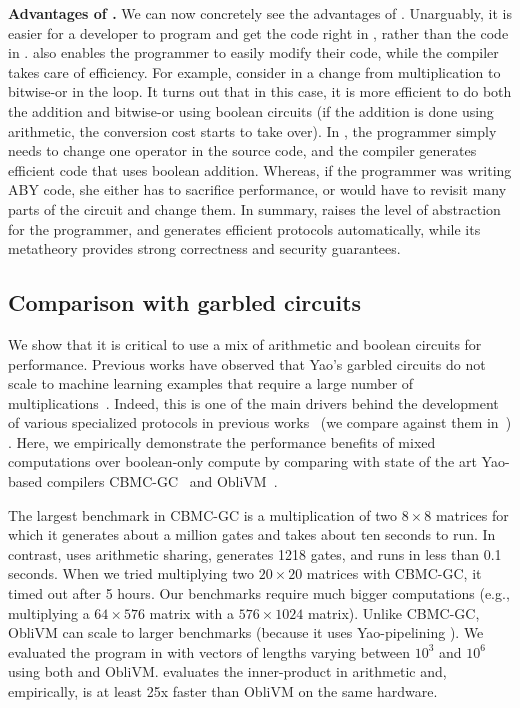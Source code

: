 \noindent\textbf{Advantages of \tool.} We can now concretely see the advantages of \tool. Unarguably, it is
easier for a developer to program and get the code right in
, rather than the code in
.
\tool also enables the
programmer to easily modify their code, while the compiler takes care
of efficiency. For example, consider in  a
change from multiplication to bitwise-or in the  loop. It
turns out that in this case, it is more efficient to do both
the addition and bitwise-or using boolean circuits (if the addition is
done using arithmetic, the conversion cost starts to take
over). In \tool, the programmer simply needs to change one operator in
the source code, and the compiler generates efficient code that uses
boolean addition. Whereas, if the programmer was writing ABY
code, she either has to sacrifice performance, or would have to
revisit many parts of the circuit and change them. In summary, \tool raises the level of abstraction for the
programmer, and generates efficient \mpc protocols automatically,
while its metatheory provides strong correctness and security
guarantees. 

\subsection{Comparison with garbled circuits}
\label{sec:oblivm}
We show that it is critical to use a mix of arithmetic and boolean circuits  for performance.
 Previous works have observed that Yao's garbled circuits do not scale to machine learning examples that require a large number of multiplications~\cite{aby,tasty,autoS,secureml,minionn,chameleon}.
Indeed, this is one of the main drivers behind the development of various specialized \mpc protocols in previous works~\cite{secureml,minionn,shafindss} (we compare against them in~) .
Here, we empirically demonstrate the performance benefits of mixed computations over boolean-only compute by comparing with state of the art Yao-based compilers CBMC-GC~\cite{cbmcgc} and ObliVM~\cite{oblivm}.

The largest benchmark in CBMC-GC is a multiplication of two $8\times 8$ matrices for which it generates about a million gates and takes about ten seconds to run. In contrast, \tool uses arithmetic sharing, generates 1218 gates, and runs in less than 0.1 seconds. When we tried multiplying two $20\times 20$ matrices with CBMC-GC, it timed out after 5 hours. Our benchmarks require much bigger computations (e.g., multiplying a $64\times576$ matrix with a $576\times1024$ matrix). Unlike CBMC-GC, ObliVM can scale to larger benchmarks (because it uses Yao-pipelining \cite{yao-pipe}). We evaluated the program in  with vectors of lengths varying between $10^3$ and $10^6$ using both \tool and ObliVM. 
\tool evaluates the inner-product in arithmetic and, empirically, is at least 25x faster than ObliVM on the same hardware. 

